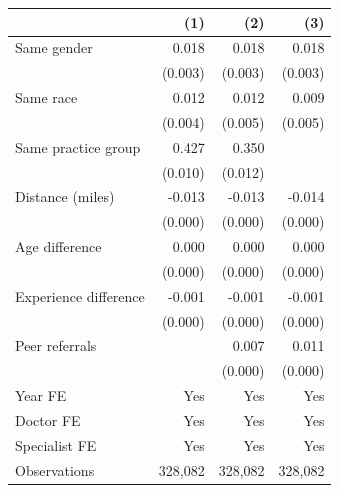 
\begin{tabular}{lrrr}
\toprule
 & (1) & (2) & (3)\\
\midrule
Same gender & 0.018 & 0.018 & 0.018\\
 & (0.003) & (0.003) & (0.003)\\
Same race & 0.012 & 0.012 & 0.009\\
 & (0.004) & (0.005) & (0.005)\\
Same practice group & 0.427 & 0.350 & \\
 & (0.010) & (0.012) & \\
Distance (miles) & -0.013 & -0.013 & -0.014\\
 & (0.000) & (0.000) & (0.000)\\
Age difference & 0.000 & 0.000 & 0.000\\
 & (0.000) & (0.000) & (0.000)\\
Experience difference & -0.001 & -0.001 & -0.001\\
 & (0.000) & (0.000) & (0.000)\\
Peer referrals &  & 0.007 & 0.011\\
 &  & (0.000) & (0.000)\\
Year FE & Yes & Yes & Yes\\
Doctor FE & Yes & Yes & Yes\\
Specialist FE & Yes & Yes & Yes\\
Observations & 328,082 & 328,082 & 328,082\\
\bottomrule
\end{tabular}
